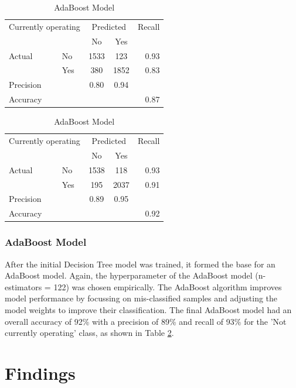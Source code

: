 \documentclass[11pt, letterpaper]{article}
\begin{document}
\begin{table}[h]
 	\caption{Confusion matrices and Evaluation metrics} 
 	\begin{minipage}{.5\linewidth}
		\caption{Decision Tree Model}
		\centering
		\begin{tabular}{l l | c c r }
\multicolumn{2}{l}{Currently operating} & \multicolumn{2}{c}{Predicted} & Recall \\
& & No & Yes &  \\ 
\cline{2-5}
Actual & No & 1533 &  123 & 0.93 \\
& Yes & 380 & 1852 & 0.83 \\  \hline
Precision&  & 0.80 & 0.94 \\ 
Accuracy & & &  & 0.87 \\
	\end{tabular}
	\label{tab:DTConfusion}
	\end{minipage}%
	\begin{minipage}{.5\linewidth}
	\caption{AdaBoost Model}
	\centering
		\begin{tabular}{l l | c c r }
\multicolumn{2}{l}{Currently operating} & \multicolumn{2}{c}{Predicted} & Recall \\
& & No & Yes &  \\ 
\cline{2-5}
Actual & No & 1538 &  118 & 0.93 \\
& Yes & 195 & 2037 & 0.91 \\  \hline
Precision&  & 0.89 & 0.95 \\ 
Accuracy & & &  & 0.92 \\
	\end{tabular}
	\label{tab:ABConfusion}
	\end{minipage}
\end{table} 

\subsubsection{AdaBoost Model}
After the initial Decision Tree model was trained, it formed the base for an AdaBoost model. Again, the hyperparameter of the AdaBoost model (n-estimators = 122) was chosen empirically. The AdaBoost algorithm improves model performance by focussing on mis-classified samples and adjusting the model weights to improve their classification. The final AdaBoost model had an overall accuracy of 92\% with a precision of 89\% and recall of 93\% for the 'Not currently operating' class, as shown in Table \ref{tab:ABConfusion}.

\section{Findings}
\end{document}
